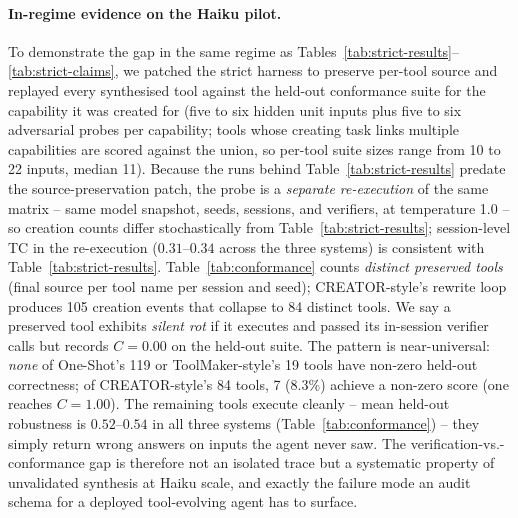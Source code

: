\documentclass[sigconf,anonymous,natbib=false]{acmart}
\begin{document}
\paragraph{In-regime evidence on the Haiku pilot.} To demonstrate the gap in the same regime as Tables~\ref{tab:strict-results}--\ref{tab:strict-claims}, we patched the strict harness to preserve per-tool source and replayed every synthesised tool against the held-out conformance suite for the capability it was created for (five to six hidden unit inputs plus five to six adversarial probes per capability; tools whose creating task links multiple capabilities are scored against the union, so per-tool suite sizes range from 10 to 22 inputs, median 11). Because the runs behind Table~\ref{tab:strict-results} predate the source-preservation patch, the probe is a \emph{separate re-execution} of the same matrix -- same model snapshot, seeds, sessions, and verifiers, at temperature 1.0 -- so creation counts differ stochastically from Table~\ref{tab:strict-results}; session-level TC in the re-execution ($0.31$--$0.34$ across the three systems) is consistent with Table~\ref{tab:strict-results}. Table~\ref{tab:conformance} counts \emph{distinct preserved tools} (final source per tool name per session and seed); CREATOR-style's rewrite loop produces 105 creation events that collapse to 84 distinct tools. We say a preserved tool exhibits \emph{silent rot} if it executes and passed its in-session verifier calls but records $C{=}0.00$ on the held-out suite. The pattern is near-universal: \emph{none} of One-Shot's 119 or ToolMaker-style's 19 tools have non-zero held-out correctness; of CREATOR-style's 84 tools, 7 ($8.3\%$) achieve a non-zero score (one reaches $C{=}1.00$). The remaining tools execute cleanly -- mean held-out robustness is $0.52$--$0.54$ in all three systems (Table~\ref{tab:conformance}) -- they simply return wrong answers on inputs the agent never saw. The verification-vs.-conformance gap is therefore not an isolated trace but a systematic property of unvalidated synthesis at Haiku scale, and exactly the failure mode an audit schema for a deployed tool-evolving agent has to surface.
\end{document}
